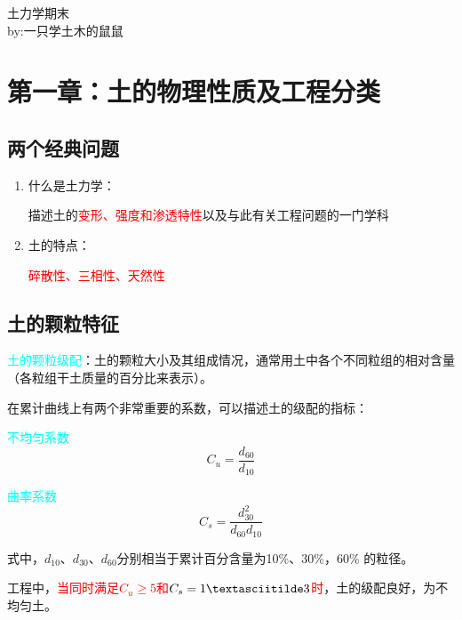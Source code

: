 \documentclass[12pt,a4paper]{ctexart}
\begin{document}
	\begin{titlepage}
		\centering
		土力学\cite{钱建固2015}期末\protect\footnotemark%
		\\
		\vspace*{\baselineskip}
		by:一只学土木的鼠鼠
		\newpage
	\end{titlepage}
	\thispagestyle{empty}%
	\newpage
	\thispagestyle{empty}%
	\tableofcontents
	\thispagestyle{empty}
	\setcounter{page}{0}
	\newpage
	\setcounter{secnumdepth}{-1}%
	\section{第一章：土的物理性质及工程分类}
	\subsection{两个经典问题}
	\begin{enumerate}
		\item 什么是土力学：
		
		描述土的\textcolor{red}{变形、强度和渗透特性}以及与此有关工程问题的一门学科
		\item 土的特点：
		
		\textcolor{red}{碎散性、三相性、天然性}
	\end{enumerate} 
	\subsection{土的颗粒特征}
	\textcolor{cyan}{土的颗粒级配}：土的颗粒大小及其组成情况，通常用土中各个不同粒组的相对含量（各粒组干土质量的百分比来表示）。
	
	在累计曲线上有两个非常重要的系数，可以描述土的级配的指标：
	
	\textcolor{cyan}{不均匀系数}
		\begin{equation}
		C_u=\frac{d_{60}}{d_{10}}
		\end{equation}
	
	\textcolor{cyan}{曲率系数}
		\begin{equation}
		C_s=\frac{d^2_{30}}{d_{60} d_{10}}
		\end{equation}
	
	式中，$d_{10}$、$d_{30}$、$d_{60}$分别相当于累计百分含量为10\%、30\%，60\% 的粒径。
	
	工程中，\textcolor{red}{当同时满足$C_u\geqslant 5$和$C_s=1\textasciitilde 3$时}，土的级配良好，为不均匀土。
	
\end{document}
